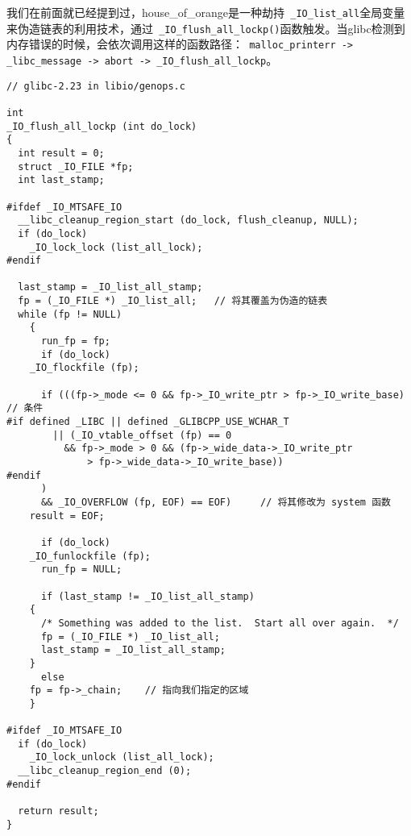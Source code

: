 我们在前面就已经提到过，house\_of\_orange是一种劫持\verb+ _IO_list_all+全局变量来伪造链表的利用技术，通过\verb+ _IO_flush_all_lockp()+函数触发。当glibc检测到内存错误的时候，会依次调用这样的函数路径：\verb+ malloc_printerr -> _libc_message -> abort -> _IO_flush_all_lockp+。
\begin{verbatim}
// glibc-2.23 in libio/genops.c

int
_IO_flush_all_lockp (int do_lock)
{
  int result = 0;
  struct _IO_FILE *fp;
  int last_stamp;

#ifdef _IO_MTSAFE_IO
  __libc_cleanup_region_start (do_lock, flush_cleanup, NULL);
  if (do_lock)
    _IO_lock_lock (list_all_lock);
#endif

  last_stamp = _IO_list_all_stamp;
  fp = (_IO_FILE *) _IO_list_all;   // 将其覆盖为伪造的链表
  while (fp != NULL)
    {
      run_fp = fp;
      if (do_lock)
    _IO_flockfile (fp);

      if (((fp->_mode <= 0 && fp->_IO_write_ptr > fp->_IO_write_base)   // 条件
#if defined _LIBC || defined _GLIBCPP_USE_WCHAR_T
        || (_IO_vtable_offset (fp) == 0
          && fp->_mode > 0 && (fp->_wide_data->_IO_write_ptr
              > fp->_wide_data->_IO_write_base))
#endif
      )
      && _IO_OVERFLOW (fp, EOF) == EOF)     // 将其修改为 system 函数
    result = EOF;

      if (do_lock)
    _IO_funlockfile (fp);
      run_fp = NULL;

      if (last_stamp != _IO_list_all_stamp)
    {
      /* Something was added to the list.  Start all over again.  */
      fp = (_IO_FILE *) _IO_list_all;
      last_stamp = _IO_list_all_stamp;
    }
      else
    fp = fp->_chain;    // 指向我们指定的区域
    }

#ifdef _IO_MTSAFE_IO
  if (do_lock)
    _IO_lock_unlock (list_all_lock);
  __libc_cleanup_region_end (0);
#endif

  return result;
}
\end{verbatim}

